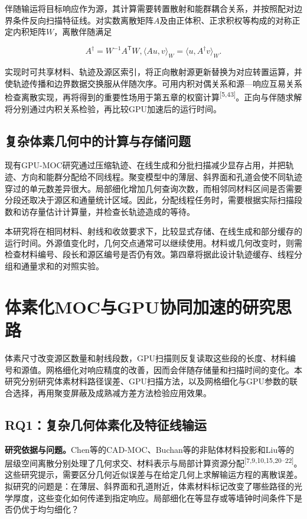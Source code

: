 \documentclass[UTF8, zihao=-4, fontset=none, a4paper]{ctexart}
\newcommand{\upcite}[1]{\textsuperscript{[#1]}}
\begin{document}
伴随输运将目标响应作为源，其计算需要转置散射和能群耦合关系，并按照配对边界条件反向扫描特征线。对实数离散矩阵\(A\)及由正体积、正求积权等构成的对称正定内积矩阵\(W\)，离散伴随满足

\begin{equation}
A^{\dagger} = W^{- 1}A^{\mathsf{T}}W,\langle Au,v\rangle_{W} = \langle u,A^{\dagger}v\rangle_{W}.
\label{eq:4}
\end{equation}

实现时可共享材料、轨迹及源区索引，将正向散射源更新替换为对应转置运算，并使轨迹传播和边界数据交换服从伴随次序。可用内积对偶关系和源---响应互易关系检查离散实现，再将得到的重要性场用于第五章的权窗计算\upcite{5,43}。正向与伴随求解将分别通过内积关系检验，再比较GPU加速后的运行时间。

\subsection{复杂体素几何中的计算与存储问题}

现有GPU-MOC研究通过压缩轨迹、在线生成和分批扫描减少显存占用，并把轨迹、方向和能群分配给不同线程。聚变模型中的薄层、斜界面和孔道会使不同轨迹穿过的单元数差异很大。局部细化增加几何查询次数，而相邻同材料区间是否需要分段还取决于源区和通量统计区域。因此，分配线程任务时，需要根据实际扫描段数和访存量估计计算量，并检查长轨迹造成的等待。

本研究将在相同材料、射线和收敛要求下，比较显式存储、在线生成和部分缓存的运行时间。外源值变化时，几何交点通常可以继续使用。材料或几何改变时，则需检查材料编号、段长和源区编号是否仍有效。第四章将据此设计轨迹缓存、线程分组和通量求和的对照实验。

\section{体素化MOC与GPU协同加速的研究思路}\label{sec:4}

体素尺寸改变源区数量和射线段数，GPU扫描则反复读取这些段的长度、材料编号和源值。网格细化对响应精度的改善，因而会伴随存储量和扫描时间的变化。本研究分别研究体素材料路径误差、GPU扫描方法，以及网格细化与GPU参数的联合选择，再用聚变屏蔽及成熟减方差方法检验应用效果。

\subsection{RQ1：复杂几何体素化及特征线输运}

\textbf{研究依据与问题。}Chen等的CAD-MOC、Buchan等的非贴体材料投影和Liu等的层级空间离散分别处理了几何求交、材料表示与局部计算资源分配\upcite{7,9,10,15,20--22}。这些研究提示，需要区分几何近似误差与在给定几何上求解输运方程的离散误差。拟研究的问题是：在薄层、斜界面和孔道附近，体素材料标记改变了哪些路径的光学厚度，这些变化如何传递到指定响应。局部细化在等显存或等墙钟时间条件下是否仍优于均匀细化？
\end{document}
